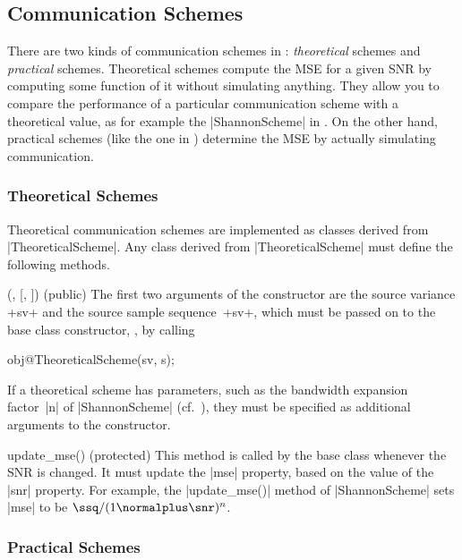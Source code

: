 \subsection{Communication Schemes}

There are two kinds of communication schemes in \jscsim: \emph{theoretical}
schemes and \emph{practical} schemes. Theoretical schemes compute the MSE for a
given SNR by computing some function of it without simulating anything. They
allow you to compare the performance of a particular communication scheme with a
theoretical value, as for example the |ShannonScheme| in .
On the other hand, practical schemes (like the one in )
determine the MSE by actually simulating communication.


\subsubsection{Theoretical Schemes}

Theoretical communication schemes are implemented as classes derived from
|TheoreticalScheme|. Any class derived from |TheoreticalScheme| must define the
following methods.

\begin{method}{(, 
  [, ]) (public)}
  The first two arguments of the constructor are the source variance +sv+ and
  the source sample sequence~+sv+, which must be passed on to the base class
  constructor, \ie, by calling
  \begin{Code}
  obj@TheoreticalScheme(sv, s);
  \end{Code}

  If a theoretical scheme has parameters, such as the bandwidth expansion
  factor~|n| of |ShannonScheme| (cf.~), they must be
  specified as additional arguments to the constructor.
\end{method}

\begin{method}{update_mse(\obj) (protected)}
    This method is called by the base class whenever the SNR is changed. It
    must update the |mse| property, based on the value of the |snr| property.
    For example, the |update_mse()| method of |ShannonScheme| sets |mse| to be
    $\ssq / (1 \normalplus \snr)^n$.
\end{method}


\subsubsection{Practical Schemes}

